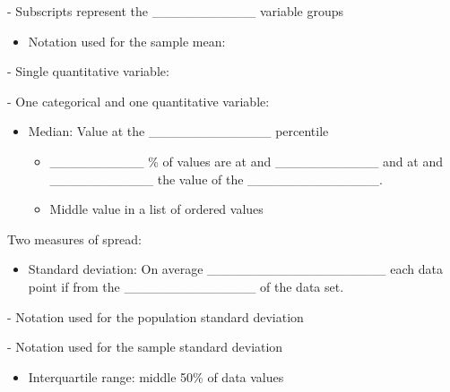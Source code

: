\documentclass[
]{report}
\providecommand{\tightlist}{%
  \setlength{\itemsep}{0pt}\setlength{\parskip}{0pt}}
\newcommand{\rgi}{\hspace{24pt}}  %
\begin{document}
\vspace{0.2in}

\rgi \rgi \rgi - Subscripts represent the \_\_\_\_\_\_\_\_\_\_\_ variable groups

\begin{itemize}
\tightlist
\item
  Notation used for the sample mean:
\end{itemize}

\rgi \rgi - Single quantitative variable:

\vspace{0.2in}

\rgi \rgi - One categorical and one quantitative variable:

\vspace{0.2in}

\begin{itemize}
\item
  Median: Value at the \_\_\_\_\_\_\_\_\_\_\_\_\_ percentile

  \begin{itemize}
  \item
    \_\_\_\_\_\_\_\_\_\_ \% of values are at and \_\_\_\_\_\_\_\_\_\_\_ and at and \_\_\_\_\_\_\_\_\_\_\_ the value of the \_\_\_\_\_\_\_\_\_\_\_\_\_\_.
  \item
    Middle value in a list of ordered values
  \end{itemize}
\end{itemize}

Two measures of spread:

\begin{itemize}
\tightlist
\item
  Standard deviation: On average \_\_\_\_\_\_\_\_\_\_\_\_\_\_\_\_\_\_\_ each data point if from the \_\_\_\_\_\_\_\_\_\_\_\_\_\_ of the data set.
\end{itemize}

\vspace{1mm}

\rgi \rgi - Notation used for the population standard deviation

\vspace{0.2in}

\rgi \rgi - Notation used for the sample standard deviation

\vspace{0.2in}

\newpage

\begin{itemize}
\tightlist
\item
  Interquartile range: middle 50\% of data values
\end{itemize}
\end{document}
